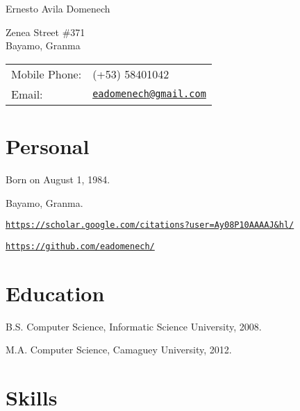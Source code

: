 \documentclass[letterpaper]{article}
\def\name{Ernesto Avila Domenech}
\renewenvironment{itemize}{
  \begin{list}{}{
    \setlength{\leftmargin}{1.5em}
  }
}{
  \end{list}
}
\begin{document}
{\huge \name}


\vspace{0.25in}

\begin{minipage}{0.45\linewidth}
  Zenea Street \#371 \\
  Bayamo, Granma
\end{minipage}
\begin{minipage}{0.45\linewidth}
  \begin{tabular}{ll}
    Mobile Phone: & (+53) 58401042 \\
    Email: & \href{mailto:eadomenech@gmail.com}{\tt eadomenech@gmail.com} \\
  \end{tabular}
\end{minipage}


\section*{Personal}

\begin{itemize}
\item Born on August 1, 1984.
\item Bayamo, Granma.
\item \href{https://scholar.google.com/citations?user=Ay08P10AAAAJ&hl/}{\tt https://scholar.google.com/citations?user=Ay08P10AAAAJ&hl/}
\item \href{https://github.com/eadomenech/}{\tt https://github.com/eadomenech/}
\end{itemize}


\section*{Education}

\begin{itemize}
  \item B.S. Computer Science, Informatic Science University, 2008.
  \item M.A. Computer Science, Camaguey University, 2012.
\end{itemize}

\section*{Skills}
\end{document}
